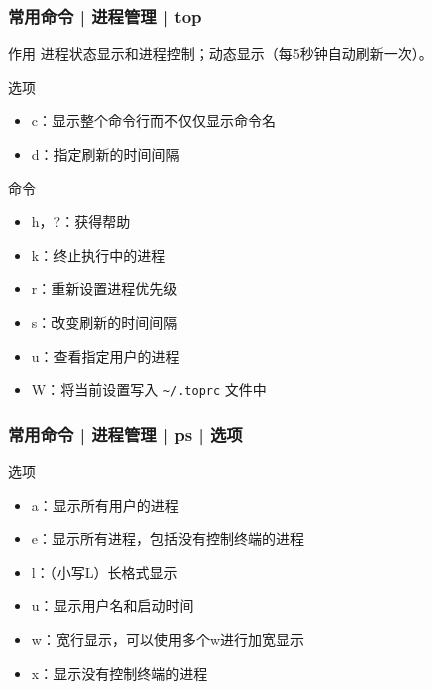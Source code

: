 \begin{frame}[fragile]
  \frametitle{常用命令 | 进程管理 | top}
  \begin{block}{作用}
    进程状态显示和进程控制；动态显示（每5秒钟自动刷新一次）。
  \end{block}
  \pause
  \begin{block}{选项}
    \begin{itemize}
      \item c：显示整个命令行而不仅仅显示命令名
      \item d：指定刷新的时间间隔
    \end{itemize}
  \end{block}
  \pause
  \begin{block}{命令}
    \begin{itemize}
      \item h，?：获得帮助
      \item k：终止执行中的进程
      \item r：重新设置进程优先级
      \item s：改变刷新的时间间隔
      \item u：查看指定用户的进程
      \item W：将当前设置写入 \verb|~/.toprc| 文件中
    \end{itemize}
  \end{block}
\end{frame}

\begin{frame}
  \frametitle{常用命令 | 进程管理 | ps | 选项}
  \begin{block}{选项}
    \begin{itemize}
      \item a：显示所有用户的进程
      \item e：显示所有进程，包括没有控制终端的进程
      \item l：（小写L）长格式显示
      \item u：显示用户名和启动时间
      \item w：宽行显示，可以使用多个w进行加宽显示
      \item x：显示没有控制终端的进程
    \end{itemize}
  \end{block}
\end{frame}

